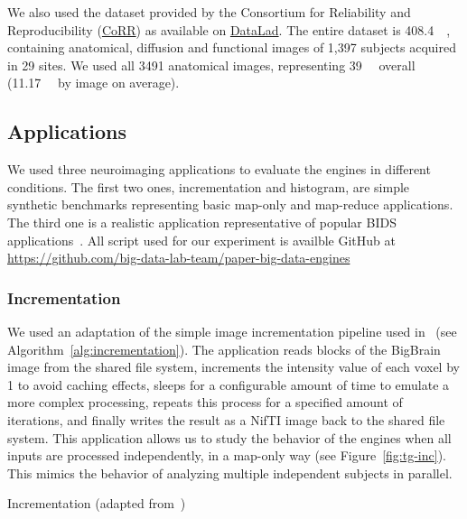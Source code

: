 \documentclass[conference]{IEEEtran}
\begin{document}
We also used the dataset provided by the Consortium for Reliability and
Reproducibility (\href{http://fcon_1000.projects.nitrc.org/indi/CoRR/html/}{CoRR}) as
available on \href{http://datasets.datalad.org/?dir=/corr/RawDataBIDS}{DataLad}. The
entire dataset is \SI{408.4}{\giga\byte}, containing anatomical, diffusion and
functional images of 1,397 subjects acquired in 29 sites. We used all 3491 anatomical
images, representing \SI{39}{\giga\byte} overall (\SI{11.17}{\mega\byte} by image on
average).


\subsection{Applications}

We used three neuroimaging applications to evaluate the engines in different
conditions. The first two ones, incrementation and histogram, are simple synthetic
benchmarks representing basic map-only and map-reduce applications. The third one is
a realistic application representative of popular BIDS
applications~\cite{gorgolewski2017bids}. All script used for our experiment is availble
GitHub at \url{https://github.com/big-data-lab-team/paper-big-data-engines}

\subsubsection{Incrementation}
We used an adaptation of the simple image incrementation pipeline used
in~\cite{hayot2019performance} (see Algorithm~\ref{alg:incrementation}).
The application reads blocks of the BigBrain image from the shared file
system, increments the intensity value of each voxel by 1 to avoid caching
effects, sleeps for a configurable amount of time to emulate a more complex
processing, repeats this process for a specified amount of iterations, and
finally writes the result as a NifTI image back to the shared file system.
This application allows us to study the behavior of the engines when all
inputs are processed independently, in a map-only way (see
Figure~\ref{fig:tg-inc}). This mimics the behavior of analyzing multiple
independent subjects in parallel.

\begin{algorithm}[!b]
    \caption{Incrementation (adapted from~\cite{hayot2019performance})}\label{alg:incrementation}
    \begin{algorithmic}
        \EndFor
    \EndFor
\end{algorithmic}
\end{algorithm}
\end{document}
